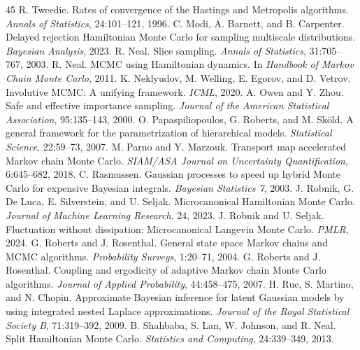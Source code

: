 \documentclass[11pt]{article}
\theoremstyle{remark}
\begin{document}
\begin{thebibliography}{45}
R. Tweedie. Rates of convergence of the Hastings and Metropolis
algorithms. \emph{Annals of Statistics}, 24:101--121, 1996.
 C. Modi, A. Barnett, and
B. Carpenter. Delayed rejection Hamiltonian Monte Carlo for sampling
multiscale distributions. \emph{Bayesian Analysis}, 2023.
 R. Neal. Slice sampling. \emph{Annals of
Statistics}, 31:705--767, 2003.
 R. Neal. MCMC using Hamiltonian
dynamics. In \emph{Handbook of Markov Chain Monte Carlo}, 2011.
 K. Neklyudov,
M. Welling, E. Egorov, and D. Vetrov. Involutive MCMC: A unifying
framework. \emph{ICML}, 2020.
 A. Owen and Y. Zhou. Safe and
effective importance sampling. \emph{Journal of the American
Statistical Association}, 95:135--143, 2000.
O. Papaspiliopoulos, G. Roberts, and M. Sk\"old. A general framework
for the parametrization of hierarchical models. \emph{Statistical
Science}, 22:59--73, 2007.
 M. Parno and Y. Marzouk.
Transport map accelerated Markov chain Monte Carlo. \emph{SIAM/ASA
Journal on Uncertainty Quantification}, 6:645--682, 2018.
 C. Rasmussen. Gaussian
processes to speed up hybrid Monte Carlo for expensive Bayesian
integrals. \emph{Bayesian Statistics 7}, 2003.
 J. Robnik, G. De Luca,
E. Silverstein, and U. Seljak. Microcanonical Hamiltonian Monte Carlo.
\emph{Journal of Machine Learning Research}, 24, 2023.
 J. Robnik and U. Seljak.
Fluctuation without dissipation: Microcanonical Langevin Monte Carlo.
\emph{PMLR}, 2024.
 G. Roberts and
J. Rosenthal. General state space Markov chains and MCMC algorithms.
\emph{Probability Surveys}, 1:20--71, 2004.
 G. Roberts and
J. Rosenthal. Coupling and ergodicity of adaptive Markov chain Monte
Carlo algorithms. \emph{Journal of Applied Probability}, 44:458--475,
2007.
 H. Rue, S. Martino, and N. Chopin.
Approximate Bayesian inference for latent Gaussian models by using
integrated nested Laplace approximations. \emph{Journal of the Royal
Statistical Society B}, 71:319--392, 2009.
 B. Shahbaba, S. Lan,
W. Johnson, and R. Neal. Split Hamiltonian Monte Carlo.
\emph{Statistics and Computing}, 24:339--349, 2013.

\end{thebibliography}
\end{document}

